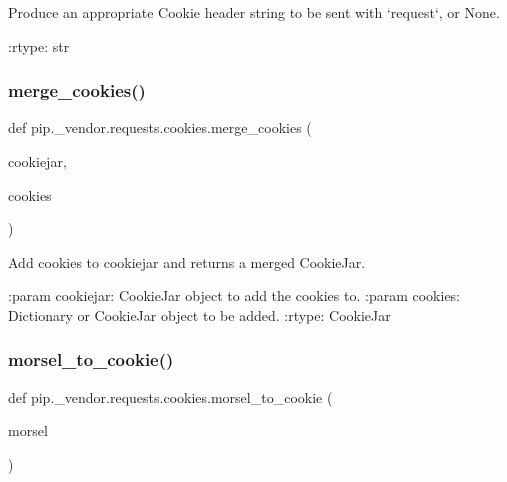 \begin{DoxyVerb}Produce an appropriate Cookie header string to be sent with `request`, or None.

:rtype: str
\end{DoxyVerb}
 \mbox{\label{namespacepip_1_1__vendor_1_1requests_1_1cookies_afd7e21f17ae60f422857d8f169c9c41f}} 
\subsubsection{\texorpdfstring{merge\+\_\+cookies()}{merge\_cookies()}}
{\footnotesize\ttfamily def pip.\+\_\+vendor.\+requests.\+cookies.\+merge\+\_\+cookies (\begin{DoxyParamCaption}\item[{}]{cookiejar,  }\item[{}]{cookies }\end{DoxyParamCaption})}

\begin{DoxyVerb}Add cookies to cookiejar and returns a merged CookieJar.

:param cookiejar: CookieJar object to add the cookies to.
:param cookies: Dictionary or CookieJar object to be added.
:rtype: CookieJar
\end{DoxyVerb}
 \mbox{\label{namespacepip_1_1__vendor_1_1requests_1_1cookies_a16d4078d6417c36bb680beebac684d0d}} 
\subsubsection{\texorpdfstring{morsel\+\_\+to\+\_\+cookie()}{morsel\_to\_cookie()}}
{\footnotesize\ttfamily def pip.\+\_\+vendor.\+requests.\+cookies.\+morsel\+\_\+to\+\_\+cookie (\begin{DoxyParamCaption}\item[{}]{morsel }\end{DoxyParamCaption})}

